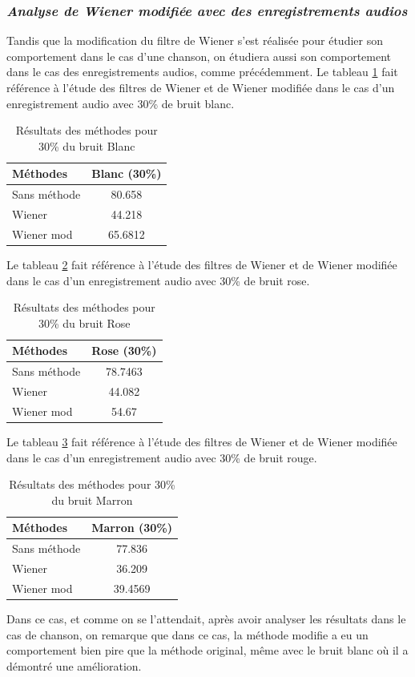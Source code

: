 \documentclass[conference,onecolumn]{IEEEtran}
\begin{document}
\subsubsection{\textit{Analyse de Wiener modifiée avec des enregistrements audios}}
Tandis que la modification du filtre de Wiener s’est réalisée pour étudier son comportement dans le cas d’une chanson, on étudiera aussi son comportement dans le cas des enregistrements audios, comme précédemment. 
\medskip 
Le tableau \ref{table:t16} fait référence à l’étude des filtres de Wiener et de Wiener modifiée dans le cas d’un enregistrement audio avec 30\% de bruit blanc.
\begin{table}[H]
    \centering
    \begin{tabular}{ l  c }
    \textbf{Méthodes} & \textbf{Blanc (30\%)} \\
    \hline
    Sans méthode & 80.658
  \\
    Wiener & 44.218 \\
    Wiener mod &65.6812  \\
    \end{tabular}
    \caption{Résultats des méthodes pour 30\% du bruit Blanc}
    \label{table:t16}
\end{table}

Le tableau \ref{table:t17} fait référence à l’étude des filtres de Wiener et de Wiener modifiée dans le cas d’un enregistrement audio avec 30\% de bruit rose.
\begin{table}[H]
    \centering
    \begin{tabular}{ l  c }
    \textbf{Méthodes} & \textbf{Rose (30\%)} \\
    \hline
    Sans méthode & 78.7463 \\
    Wiener & 44.082 \\
    Wiener mod & 54.67 \\
    \end{tabular}
    \caption{Résultats des méthodes pour 30\% du bruit Rose}
    \label{table:t17}
\end{table}

Le tableau \ref{table:t18} fait référence à l’étude des filtres de Wiener et de Wiener modifiée dans le cas d’un enregistrement audio avec 30\% de bruit rouge.
\begin{table}[H]
    \centering
    \begin{tabular}{ l  c }
    \textbf{Méthodes} & \textbf{Marron (30\%)} \\
    \hline
    Sans méthode & 77.836 \\
    Wiener & 36.209 \\
    Wiener mod & 39.4569 \\
    \end{tabular}
    \caption{Résultats des méthodes pour 30\% du bruit Marron}
    \label{table:t18}
\end{table}
Dans ce cas, et comme on se l’attendait, après avoir analyser les résultats dans le cas de chanson, on remarque que dans ce cas, la méthode modifie a eu un comportement bien pire que la méthode original, même avec le bruit blanc où il a démontré une amélioration. 
\medskip 
\end{document}
